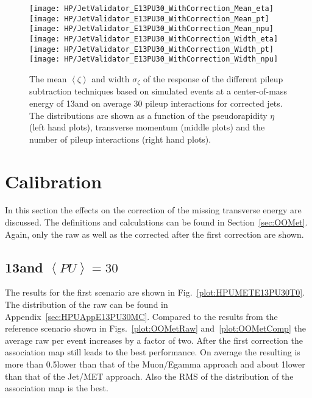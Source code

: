 \begin{figure}[h!t]
  \centering
  \texttt{[image: HP/JetValidator\_E13PU30\_WithCorrection\_Mean\_eta]}
  \texttt{[image: HP/JetValidator\_E13PU30\_WithCorrection\_Mean\_pt]}
  \texttt{[image: HP/JetValidator\_E13PU30\_WithCorrection\_Mean\_npu]}
  \\
  \texttt{[image: HP/JetValidator\_E13PU30\_WithCorrection\_Width\_eta]}
  \texttt{[image: HP/JetValidator\_E13PU30\_WithCorrection\_Width\_pt]}
  \texttt{[image: HP/JetValidator\_E13PU30\_WithCorrection\_Width\_npu]}
  \caption[Mean and width of the \pt{} response of different pileup subtraction techniques based on simulated \ttbar events with 13\TeV and PU=30 for corrected jets]{The mean $\left<\zeta\right>$  and width $\sigma_{\zeta}$ of the \pt{} response of the different pileup subtraction techniques based on simulated \ttbar events at a center-of-mass energy of 13\TeV and on average 30 pileup interactions for corrected jets. The distributions are shown as a function of the pseudorapidity $\eta$ (left hand plots), transverse momentum (middle plots) and the number of pileup interactions (right hand plots). \label{plot:HPUJetE13PU30W}}
\end{figure}

\section{\texorpdfstring{\MET{}}{MET} Calibration \label{sec:HPUMET}}

In this section the effects on the correction of the missing transverse energy are discussed. The definitions and calculations can be found in Section~\ref{sec:OOMet}. Again, only the raw \MET{} as well as the corrected \MET{} after the first correction are shown.

\subsection{13\TeV and $\left<PU\right> =30$ \label{sec:HPUMETE13PU30}}

The results for the first scenario are shown in Fig.~\ref{plot:HPUMETE13PU30T0}. The distribution of the raw \MET{} can be found in Appendix~\ref{sec:HPUAppE13PU30MC}. Compared to the results from the reference scenario shown in Figs.~\ref{plot:OOMetRaw} and~\ref{plot:OOMetComp} the average raw \MET{} per event increases by a factor of two. After the first correction the association map still leads to the best performance. On average the resulting \MET{} is more than 0.5\GeV lower than that of the Muon/Egamma approach and about 1\GeV lower than that of the Jet/MET approach. Also the RMS of the distribution of the association map is the best.

